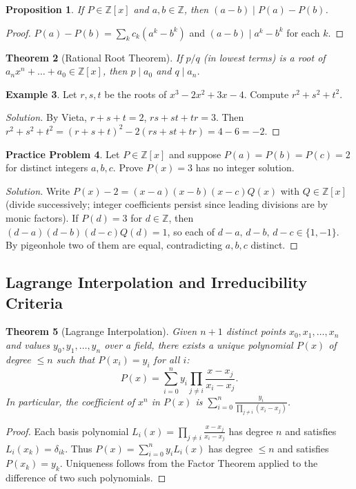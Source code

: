 \documentclass[11pt]{article}
\theoremstyle{plain}
\newtheorem{theorem}{Theorem}[section]
\newtheorem{proposition}[theorem]{Proposition}
\theoremstyle{definition}
\newtheorem{example}[theorem]{Example}
\newtheorem{problem}[theorem]{Practice Problem}
\newenvironment{solution}{\begin{proof}[Solution]}{\end{proof}}
\newcommand{\ZZ}{\mathbb{Z}}
\begin{document}
\begin{proposition}\label{prop:ab}
If $P \in \ZZ[x]$ and $a,b \in \ZZ$, then $(a-b) \mid P(a)-P(b)$.
\end{proposition}
\begin{proof}
$P(a)-P(b) = \sum_k c_k (a^k - b^k)$ and $(a-b)\mid a^k-b^k$ for each $k$.
\end{proof}

\begin{theorem}[Rational Root Theorem]
If $p/q$ (in lowest terms) is a root of $a_nx^n+\dots+a_0 \in \ZZ[x]$, then
$p \mid a_0$ and $q \mid a_n$.
\end{theorem}

\begin{example}
Let $r,s,t$ be the roots of $x^3 - 2x^2 + 3x - 4$. Compute $r^2+s^2+t^2$.
\end{example}
\begin{solution}
By Vieta, $r+s+t = 2$, $rs+st+tr = 3$. Then
$r^2+s^2+t^2 = (r+s+t)^2 - 2(rs+st+tr) = 4 - 6 = -2$.
\end{solution}

\begin{problem}
Let $P\in\ZZ[x]$ and suppose $P(a)=P(b)=P(c)=2$ for distinct integers $a,b,c$.
Prove $P(x)=3$ has no integer solution.
\end{problem}
\begin{solution}
Write $P(x)-2 = (x-a)(x-b)(x-c)Q(x)$ with $Q\in\ZZ[x]$ (divide successively; integer
coefficients persist since leading divisions are by monic factors). If
$P(d)=3$ for $d \in \ZZ$, then $(d-a)(d-b)(d-c)Q(d)=1$, so each of
$d-a,\,d-b,\,d-c \in \{1,-1\}$. By pigeonhole two of them are equal, contradicting
$a,b,c$ distinct.
\end{solution}

\subsection{Lagrange Interpolation and Irreducibility Criteria}

\begin{theorem}[Lagrange Interpolation]
Given $n+1$ distinct points $x_0, x_1, \dots, x_n$ and values $y_0, y_1, \dots, y_n$ over a field, there exists a unique polynomial $P(x)$ of degree $\le n$ such that $P(x_i) = y_i$ for all $i$:
\[
P(x) = \sum_{i=0}^n y_i \prod_{j \ne i} \frac{x - x_j}{x_i - x_j}.
\]
In particular, the coefficient of $x^n$ in $P(x)$ is $\sum_{i=0}^n \frac{y_i}{\prod_{j \ne i}(x_i - x_j)}$.
\end{theorem}
\begin{proof}
Each basis polynomial $L_i(x) = \prod_{j \ne i} \frac{x-x_j}{x_i-x_j}$ has degree $n$ and satisfies $L_i(x_k) = \delta_{ik}$. Thus $P(x) = \sum_{i=0}^n y_i L_i(x)$ has degree $\le n$ and satisfies $P(x_k) = y_k$. Uniqueness follows from the Factor Theorem applied to the difference of two such polynomials.
\end{proof}
\end{document}
